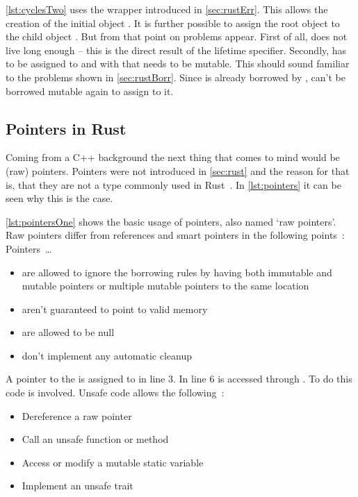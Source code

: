 \documentclass[thesis]{subfiles}
\begin{document}
    \autoref{lst:cyclesTwo} uses the  wrapper introduced in \autoref{sec:rustErr}.
    This allows the creation of the initial \Node object .
    It is further possible to assign the root object  to the child object .
    But from that point on problems appear.
    First of all,  does not live long enough -- this is the direct result of the lifetime specifier.
    Secondly,  has to be assigned to  and with that  needs to be mutable.
    This should sound familiar to the problems shown in \autoref{sec:rustBorr}.
    Since  is already borrowed by ,  can't be borrowed mutable again to assign  to it.

  \subsection{Pointers in Rust}
    Coming from a C++ background the next thing that comes to mind would be (raw) pointers.
    Pointers were not introduced in \autoref{sec:rust} and the reason for that is, that they are not a type commonly used in Rust~\autocite[Raw Pointers]{rust-book1}.
    In \autoref{lst:pointers} it can be seen why this is the case.

    \autoref{lst:pointersOne} shows the basic usage of pointers, also named `raw pointers'.
    Raw pointers differ from references and smart pointers in the following points~\autocite[Unsafe Rust]{rust-book}: Pointers~\ldots
    \begin{itemize}
      \item are allowed to ignore the borrowing rules by having both immutable and mutable pointers or multiple mutable pointers to the same location
      \item aren't guaranteed to point to valid memory
      \item are allowed to be null
      \item don’t implement any automatic cleanup
    \end{itemize}
    A pointer to the \String {} is assigned to  in line 3.
    In line 6  is accessed through .
    To do this  code is involved.
    Unsafe code allows the following~\autocite[Unsafe Rust]{rust-book}:
    \begin{itemize}
      \item Dereference a raw pointer
      \item Call an unsafe function or method
      \item Access or modify a mutable static variable
      \item Implement an unsafe trait
    \end{itemize}
\end{document}
